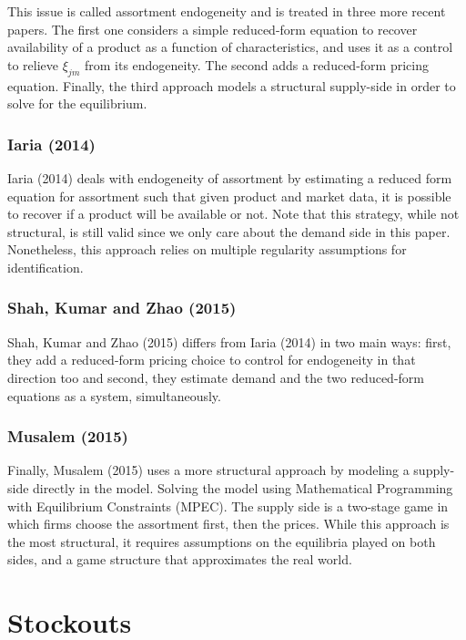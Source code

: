 This issue is called assortment endogeneity and is treated in three more recent papers. The first one considers a simple reduced-form equation to recover availability of a product as a function of characteristics, and uses it as a control to relieve $\xi_{jm}$ from its endogeneity. The second adds a reduced-form pricing equation. Finally, the third approach models a structural supply-side in order to solve for the equilibrium.

\subsubsection{Iaria (2014)}

Iaria (2014) deals with endogeneity of assortment by estimating a reduced form equation for assortment such that given product and market data, it is possible to recover if a product will be available or not. Note that this strategy, while not structural, is still valid since we only care about the demand side in this paper. Nonetheless, this approach relies on multiple regularity assumptions for identification.

\subsubsection{Shah, Kumar and Zhao (2015)}

Shah, Kumar and Zhao (2015) differs from Iaria (2014) in two main ways: first, they add a reduced-form pricing choice to control for endogeneity in that direction too and second, they estimate demand and the two reduced-form equations as a system, simultaneously.

\subsubsection{Musalem (2015)}

Finally, Musalem (2015) uses a more structural approach by modeling a supply-side directly in the model. Solving the model using Mathematical Programming with Equilibrium Constraints (MPEC). The supply side is a two-stage game in which firms choose the assortment first, then the prices. While this approach is the most structural, it requires assumptions on the equilibria played on both sides, and a game structure that approximates the real world.

\section{Stockouts}

